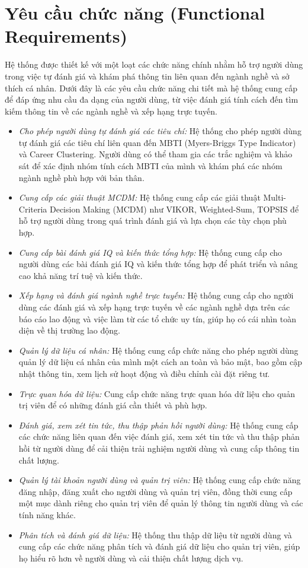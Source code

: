 \section{Yêu cầu chức năng (Functional Requirements)}

Hệ thống được thiết kế với một loạt các chức năng chính nhằm hỗ trợ người dùng trong việc tự đánh giá và khám phá thông tin liên quan đến ngành nghề và sở thích cá nhân. Dưới đây là các yêu cầu chức năng chi tiết mà hệ thống cung cấp để đáp ứng nhu cầu đa dạng của người dùng, từ việc đánh giá tính cách đến tìm kiếm thông tin về các ngành nghề và xếp hạng trực tuyến.

\begin{itemize}
    \item \textit{Cho phép người dùng tự đánh giá các tiêu chí:}
    Hệ thống cho phép người dùng tự đánh giá các tiêu chí liên quan đến MBTI (Myers-Briggs Type Indicator) và Career Clustering. Người dùng có thể tham gia các trắc nghiệm và khảo sát để xác định nhóm tính cách MBTI của mình và khám phá các nhóm ngành nghề phù hợp với bản thân.
    \item \textit{Cung cấp các giải thuật MCDM:}
    Hệ thống cung cấp các giải thuật Multi-Criteria Decision Making (MCDM) như VIKOR, Weighted-Sum, TOPSIS để hỗ trợ người dùng trong quá trình đánh giá và lựa chọn các tùy chọn phù hợp.
    \item \textit{Cung cấp bài đánh giá IQ và kiến thức tổng hợp:}
    Hệ thống cung cấp cho người dùng các bài đánh giá IQ và kiến thức tổng hợp để phát triển và nâng cao khả năng trí tuệ và kiến thức.
    \item \textit{Xếp hạng và đánh giá ngành nghề trực tuyến:}
    Hệ thống cung cấp cho người dùng các đánh giá và xếp hạng trực tuyến về các ngành nghề dựa trên các báo cáo lao động và việc làm từ các tổ chức uy tín, giúp họ có cái nhìn toàn diện về thị trường lao động.
    \item \textit{Quản lý dữ liệu cá nhân:}
    Hệ thống cung cấp chức năng cho phép người dùng quản lý dữ liệu cá nhân của mình một cách an toàn và bảo mật, bao gồm cập nhật thông tin, xem lịch sử hoạt động và điều chỉnh cài đặt riêng tư.
    \item \textit{Trực quan hóa dữ liệu:}
    Cung cấp chức năng trực quan hóa dữ liệu cho quản trị viên để có những đánh giá cần thiết và phù hợp.
    \item \textit{Đánh giá, xem xét tin tức, thu thập phản hồi người dùng:}
    Hệ thống cung cấp các chức năng liên quan đến việc đánh giá, xem xét tin tức và thu thập phản hồi từ người dùng để cải thiện trải nghiệm người dùng và cung cấp thông tin chất lượng.
    \item \textit{Quản lý tài khoản người dùng và quản trị viên:}
    Hệ thống cung cấp chức năng đăng nhập, đăng xuất cho người dùng và quản trị viên, đồng thời cung cấp một mục dành riêng cho quản trị viên để quản lý thông tin người dùng và các tính năng khác.
    \item \textit{Phân tích và đánh giá dữ liệu:}
    Hệ thống thu thập dữ liệu từ người dùng và cung cấp các chức năng phân tích và đánh giá dữ liệu cho quản trị viên, giúp họ hiểu rõ hơn về người dùng và cải thiện chất lượng dịch vụ.

\end{itemize}

